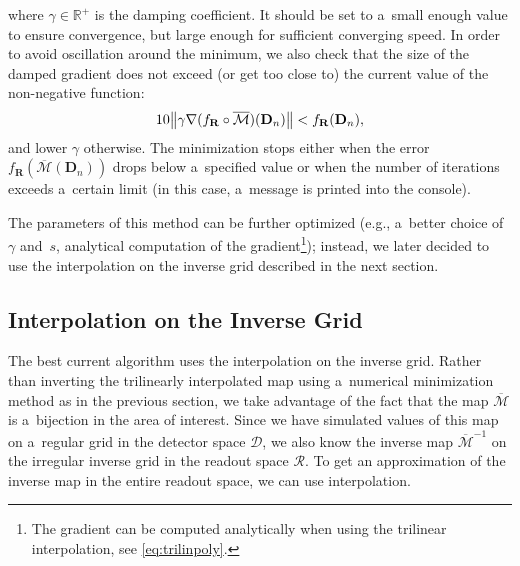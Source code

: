			where $\gamma\in\mathbb{R}^+$ is the damping coefficient. It should be set to a~small enough value to ensure convergence, but large enough for sufficient converging speed. In order to avoid oscillation around the minimum, we also check that the size of the damped gradient does not exceed (or get too close to) the current value of the non-negative function:
				\begin{equation}
					10 \norm{\gamma \nabla(f_\mathbf{R}\circ\overline{\mathcal{M}})(\mathbf{D}_n)} < f_\mathbf{R}(\mathbf{D}_n),
				\end{equation}
			and lower $\gamma$ otherwise. The minimization stops either when the error $f_\mathbf{R}(\overline{\mathcal{M}}(\mathbf{D}_n))$ drops below a~specified value or when the number of iterations exceeds a~certain limit (in this case, a~message is printed into the console).
			
			The parameters of this method can be further optimized (e.g., a~better choice of $\gamma$ and~$s$, analytical computation of the gradient\footnote{The gradient can be computed analytically when using the trilinear interpolation, see \cref{eq:trilinpoly}.}); instead, we later decided to use the interpolation on the inverse grid described in the next section.
		
		\subsection{Interpolation on the Inverse Grid}
		\label{sec:interpol}			
			The best current algorithm uses the interpolation on the inverse grid. Rather than inverting the trilinearly interpolated map using a~numerical minimization method as in the previous section, we take advantage of the fact that the map $\overline{\mathcal{M}}$ is a~bijection in the area of interest. Since we have simulated values of this map on a~regular grid in the detector space $\mathcal{D}$, we also know the inverse map $\overline{\mathcal{M}}^{-1}$ on the irregular inverse grid in the readout space $\mathcal{R}$. To get an approximation of the inverse map in the entire readout space, we can use interpolation.
			
